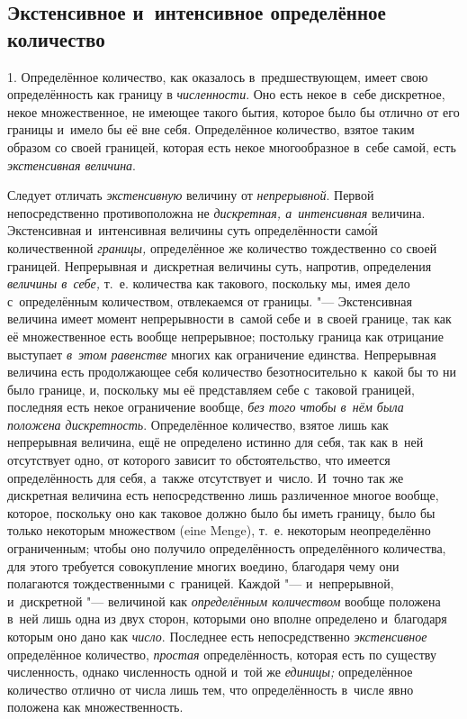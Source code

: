 \subsection{Экстенсивное и~интенсивное определённое количество}


1. Определённое количество, как оказалось в~предшествующем, имеет свою
определённость как границу в {\em численности}. Оно есть некое в~себе дискретное,
некое множественное, не имеющее такого бытия, которое было бы отлично от его
границы и~имело бы её вне себя. Определённое количество, взятое таким образом
со своей границей, которая есть некое многообразное в~себе самой, есть
{\em экстенсивная величина}.

Следует отличать {\em экстенсивную} величину от {\em непрерывной}. Первой
непосредственно противоположна не {\em дискретная, а~интенсивная}
величина. Экстенсивная и~интенсивная величины суть определённости сам\'{о}й
количественной {\em границы,} определённое же количество тождественно со своей
границей. Непрерывная и~дискретная величины суть, напротив, определения
{\em величины в~себе,} т.~е. количества как такового, поскольку мы, имея дело
с~определённым количеством, отвлекаемся от границы. "--- Экстенсивная величина
имеет момент непрерывности в~самой себе и~в своей границе, так как её
множественное есть вообще непрерывное; постольку граница как отрицание
выступает {\em в~этом равенстве} многих как ограничение единства. Непрерывная
величина есть продолжающее себя количество безотносительно к~какой бы то ни
было границе, и, поскольку мы её представляем себе с~таковой границей,
последняя есть некое ограничение вообще, {\em без того чтобы в~нём была
положена дискретность}. Определённое количество, взятое лишь как непрерывная
величина, ещё не определено истинно для себя, так как в~ней отсутствует одно,
от которого зависит то обстоятельство, что имеется определённость для себя,
а~также отсутствует и~число. И~точно так же дискретная величина есть
непосредственно лишь различенное многое вообще, которое, поскольку оно как
таковое должно было бы иметь границу, было бы только некоторым множеством (eine
Men\-ge), т.~е. некоторым неопределённо ограниченным; чтобы оно получило
определённость определённого количества, для этого требуется совокупление
многих воедино, благодаря чему они полагаются тождественными с~границей.
Каждой "--- и~непрерывной, и~дискретной "--- величиной как
{\em определённым количеством} вообще положена в~ней лишь одна из двух сторон,
которыми оно вполне определено и~благодаря которым оно дано
как {\em число}. Последнее
есть непосредственно {\em экстенсивное} определённое количество, {\em простая}
определённость, которая есть по существу численность, однако численность одной
и~той же {\em единицы;} определённое количество отлично от числа лишь тем, что определённость
в~числе явно положена как множественность.

